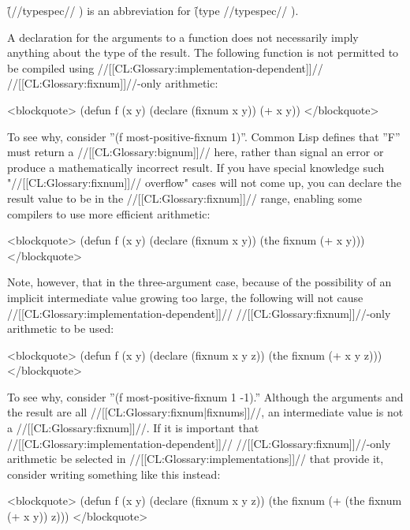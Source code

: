 \f{(//typespec// )} is an abbreviation for \f{(type //typespec// )}.

A  declaration for the arguments to a function does not necessarily imply anything about the type of the result. The following function is not permitted to be compiled using //[[CL:Glossary:implementation-dependent]]// //[[CL:Glossary:fixnum]]//-only arithmetic:

<blockquote> (defun f (x y) (declare (fixnum x y)) (+ x y)) </blockquote>

To see why, consider ''(f most-positive-fixnum 1)''. Common Lisp defines that ''F'' must return a //[[CL:Glossary:bignum]]// here, rather than signal an error or produce a mathematically incorrect result. If you have special knowledge such "//[[CL:Glossary:fixnum]]// overflow" cases will not come up, you can declare the result value to be in the //[[CL:Glossary:fixnum]]// range, enabling some compilers to use more efficient arithmetic:

<blockquote> (defun f (x y) (declare (fixnum x y)) (the fixnum (+ x y))) </blockquote>

Note, however, that in the three-argument case, because of the possibility of an implicit intermediate value growing too large, the following will not cause //[[CL:Glossary:implementation-dependent]]// //[[CL:Glossary:fixnum]]//-only arithmetic to be used:

<blockquote> (defun f (x y) (declare (fixnum x y z)) (the fixnum (+ x y z))) </blockquote>

To see why, consider ''(f most-positive-fixnum 1 -1).'' Although the arguments and the result are all //[[CL:Glossary:fixnum|fixnums]]//, an intermediate value is not a //[[CL:Glossary:fixnum]]//. If it is important that //[[CL:Glossary:implementation-dependent]]// //[[CL:Glossary:fixnum]]//-only arithmetic be selected in //[[CL:Glossary:implementations]]// that provide it, consider writing something like this instead:

<blockquote> (defun f (x y) (declare (fixnum x y z)) (the fixnum (+ (the fixnum (+ x y)) z))) </blockquote>

       
